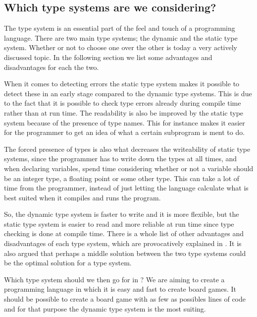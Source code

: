 \subsection{Which type systems are we considering?}

The type system is an essential part of the feel and touch of a programming
language. There are two main type systems; the dynamic and the static
type system. Whether or not to choose one over the other is today a very
actively discussed topic. In the following section we list some advantages and
disadvantages for each the two.

When it comes to detecting errors the static type system makes it possible to
detect these in an early stage compared to the dynamic type systems. This is
due to the fact that it is possible to check type errors already during
compile time rather than at run time. The readability is also be improved by
the static type system because of the presence of type names. This for instance
makes it easier for the programmer to get an idea of what a certain
subprogram is ment to do. 

The forced presence of types is also what decreases the writeability of static
type systems, since the programmer has to write down the types at all times, and
when declaring variables, spend time considering whether or not a variable
should be an integer type, a floating point or some other type. This can take
a lot of time from the programmer, instead of just letting the language calculate 
what is best suited when it compiles and runs the program.

So, the dynamic type system is faster to write and it is more flexible, but the
static type system is easier to read and more reliable at run time since type
checking is done at compile time. There is a whole list of other advantages and
disadvantages of each type system, which are provocatively explained in
\cite{staticvsdynamictypesystem}. It is also argued that perhaps a middle
solution between the two type systems could be the optimal solution for a type
system.

Which type system should we then go for in \productname{}? We are aiming to create a
programming language in which it is easy and fast to create board games. It
should be possible to create a board game with as few as possibles lines of code
and for that purpose the dynamic type system is the most suiting.
